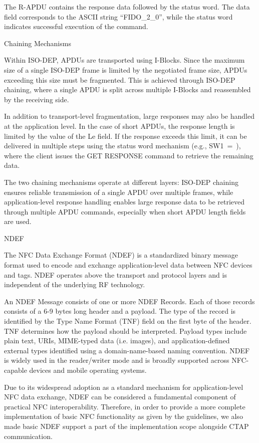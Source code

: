 \nl The R-APDU contains the response data followed by the status word. The data field corresponds to the ASCII string ``FIDO\_2\_0'', while the status word~ indicates successful execution of the command.

 Chaining Mechanisms

Within ISO-DEP, APDUs are transported using I-Blocks. Since the maximum size of a single ISO-DEP frame is limited by the negotiated frame size, APDUs exceeding this size must be fragmented. This is achieved through {\sbf ISO-DEP chaining}, where a single APDU is split across multiple I-Blocks and reassembled by the receiving side.

\nl In addition to transport-level fragmentation, large responses may also be handled at the application level. In the case of short APDUs, the response length is limited by the value of the Le field. If the response exceeds this limit, it can be delivered in multiple steps using the status word mechanism (e.g., SW1~=~), where the client issues the GET RESPONSE command to retrieve the remaining data.

\nl The two chaining mechanisms operate at different layers: ISO-DEP chaining ensures reliable transmission of a single APDU over multiple frames, while application-level response handling enables large response data to be retrieved through multiple APDU commands, especially when short APDU length fields are used.

 NDEF

The {\sbf NFC Data Exchange Format (NDEF)} is a standardized binary message format used to encode and exchange application-level data between NFC devices and tags. NDEF operates above the transport and protocol layers and is independent of the underlying RF technology.

\nl An {\sbf NDEF Message} consists of one or more {\sbf NDEF Records}. Each of those records consists of a 6-9 bytes long header and a payload. The type of the record is identified by the {\sbf Type Name Format (TNF)} field on the first byte of the header. TNF determines how the payload should be interpreted. Payload types include plain text, URIs, MIME-typed data (i.e. images), and application-defined external types identified using a domain-name-based naming convention. NDEF is widely used in the reader/writer mode and is broadly supported across NFC-capable devices and mobile operating systems.

\nl Due to its widespread adoption as a standard mechanism for application-level NFC data exchange, NDEF can be considered a fundamental component of practical NFC interoperability. Therefore, in order to provide a more complete implementation of basic NFC functionality as given by the guidelines, we also made basic NDEF support a part of the implementation scope alongside CTAP communication.


